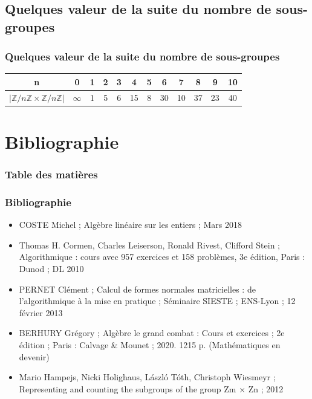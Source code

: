 \documentclass{beamer}
\begin{document}
\subsection{Quelques valeur de la suite du nombre de sous-groupes}
\begin{frame}
\frametitle{Quelques valeur de la suite du nombre de sous-groupes}
\begin{center}
    \begin{tabular}{|c|c|c|c|c|c|c|c|c|c|c|c|}
        \hline
        n       & 0     & 1 & 2 & 3 & 4  & 5 & 6  & 7  & 8  & 9  & 10 \tabularnewline
        \hline
        $|\mathbb{Z}/n\mathbb{Z} \times \mathbb{Z}/n\mathbb{Z}|$ & $\infty$ & 1 & 5 & 6 & 15 & 8 & 30 & 10 & 37 & 23 & 40 \tabularnewline
        \hline
    \end{tabular}
\end{center}
\end{frame}


\section{Bibliographie}
\begin{frame}
\frametitle{Table des matières}
\tableofcontents[currentsection]
\end{frame}


\begin{frame}
\frametitle{Bibliographie}
\begin{itemize}
    \item COSTE Michel ; Algèbre linéaire sur les entiers ; Mars 2018
    \item Thomas H. Cormen, Charles Leiserson, Ronald Rivest, Clifford Stein ; Algorithmique : cours avec 957 exercices et 158 problèmes, 3e édition, Paris : Dunod ; DL 2010
    \item PERNET Clément ; Calcul de formes normales matricielles : de l’algorithmique à la mise en pratique ; Séminaire SIESTE ; ENS-Lyon ; 12 février 2013
    \item BERHURY Grégory ; Algèbre le grand combat : Cours et exercices ; 2e édition ; Paris : Calvage & Mounet ; 2020. 1215 p. (Mathématiques en devenir)
    \item Mario Hampejs, Nicki Holighaus, László Tóth, Christoph Wiesmeyr ; Representing and counting the subgroups of the group Zm × Zn ; 2012
\end{itemize}
\end{frame}
\end{document}
